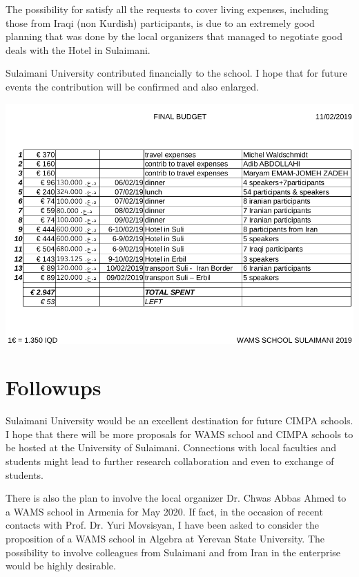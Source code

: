 \documentclass[12pt,a4paper]{scrartcl}
\begin{document}
The possibility for satisfy all the requests to cover living expenses, including those from Iraqi (non Kurdish) participants, is due to an extremely good planning that was done by the local organizers that managed to negotiate good deals with the Hotel in Sulaimani.

Sulaimani University contributed financially to the school. I hope that for future events the contribution will be confirmed and also enlarged.\bigskip


\centerline{\includegraphics[width=18cm]{budget.png}}

{}

\section{Followups}

Sulaimani University would be an excellent destination for future CIMPA schools. I hope that there will be more
proposals for WAMS school and CIMPA schools to be hosted at the University of Sulaimani. Connections with local faculties and students might lead to further research collaboration and even to exchange of students.

There is also the plan to involve the local organizer Dr. Chwas Abbas Ahmed to a WAMS school in Armenia for May 2020. If fact, in the occasion of recent contacts with Prof. Dr. Yuri Movsisyan, I have been asked to consider the proposition of a WAMS school in Algebra at Yerevan State University. The possibility to involve colleagues from Sulaimani and from Iran in the enterprise would be highly desirable.
\end{document}
